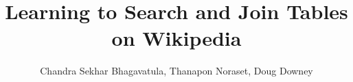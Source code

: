 \documentclass{sig-alternate}
\begin{document}
\sloppy
\conferenceinfo{}{}

\newcommand{\systemName}[0]{\emph{WikiTables}}
\newcommand{\systemNameHeader}[0]{WikiTables}
\newcommand{\columnRankingTaskName}[0]{\emph{relevant join}}
\newcommand{\tableSearchTaskName}[0]{\emph{table search}}
\newcommand{\columnRankingTaskNameHeader}[0]{Relevant Join}
\newcommand{\tableSearchTaskNameHeader}[0]{Table Search}
\newcommand*{\myfont}{\fontfamily{pzc}\selectfont}

\newcommand{\tableCorpus}[0]{\cal{T}}
\newcommand{\queryTable}[0]{\mathbf{T}_{q}}
\newcommand{\targetTable}[0]{\mathbf{T}_{t}}
\newcommand{\finalTable}[0]{\mathbf{T}_{f}}
\newcommand{\matchCorpus}[0]{\cal{M}}
\newcommand{\matchPerc}[0]{\emph{MatchPercent}}


\newcommand{\sourceCol}[0]{\mathbf{c}^{q}_{s}}
\newcommand{\matchedCol}[0]{\mathbf{c}^{t}_{m}}
\newcommand{\addableCol}[0]{\mathbf{c}^{t}_{c}}
\newcommand{\addedCol}[0]{\mathbf{c}^{t}_{a}}
\newcommand{\sarmaSys}[0]{\textsc{Rel\_Table}}
\newcommand{\ventisSys}[0]{\textsc{Table}}
\newcommand{\rjBaseline}[0]{\textsc{Base}}
\newcommand{\rjAblateSR}[0]{\emph{WikiTables$-$SR}}
\newcommand{\rjBest}[0]{\emph{WikiTables}}
\newcommand{\googft}[0]{\textsc{Google Fusion Tables}}
\newcommand{\venetisEtAl}[0]{Venetis et al.}
\newcommand{\sarmaEtAl}[0]{Sarma et al.}
\def\Section {\S}

\title{Learning to Search and Join Tables on Wikipedia} 

\author{\alignauthor Chandra Sekhar Bhagavatula, Thanapon Noraset, Doug Downey \\
 \\
} 

\maketitle








\end{document}
